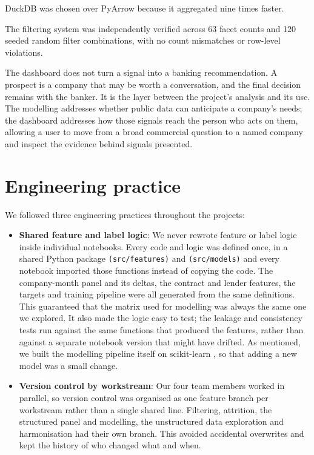 \documentclass[    author={Samuel Menon Demelo; Sneha Saphala Ram Prasad; 
Viktor Ander Lindholm; Vishal Khatri},
               supervisor={Prof. Fernando Moreno-Pino},
                   degree={MSc},
                    title={Lloyds Commercial Banking Intelligence},
                 subtitle={Ranking SME Lending, Risk and Growth Prospects for Lloyds Banking Group},
                     type={},
                     year={2026}]{dissertation}
\begin{document}
DuckDB was chosen over PyArrow because it aggregated nine times faster.

The filtering system was independently verified across 63 facet counts and 120 seeded random filter combinations, with no count mismatches or row-level violations.

The dashboard does not turn a signal into a banking recommendation. A prospect is a company that may be worth a conversation, and the final decision remains with the banker. It is the layer between the project's analysis and its use. The modelling addresses whether public data can anticipate a company's needs; the dashboard addresses how those signals reach the person who acts on them, allowing a user to move from a broad commercial question to a named company and inspect the evidence behind signals presented.

\section{Engineering practice}
We followed three engineering practices throughout the projects:

\begin{itemize}
    \item \textbf{Shared feature and label logic}: We never rewrote feature or label logic inside individual notebooks. Every code and logic was defined once, in a shared Python package \texttt{(src/features)} and \texttt{(src/models)} and every notebook imported those functions instead of copying the code. The company-month panel and its deltas, the contract and lender features, the targets and training pipeline were all generated from the same definitions. This guaranteed that the matrix used for modelling was always the same one we explored. It also made the logic easy to test; the leakage and consistency tests run against the same functions that produced the features, rather than against a separate notebook version that might have drifted. As mentioned, we built the modelling pipeline itself on scikit-learn \cite{sklearn_docs}, so that adding a new model was a small change.
\end{itemize}

\begin{itemize}
    \item \textbf{Version control by workstream}: Our four team members worked in parallel, so version control was organised as one feature branch per workstream rather than a single shared line. Filtering, attrition, the structured panel and modelling, the unstructured data exploration and harmonisation had their own branch. This avoided accidental overwrites and kept the history of who changed what and when.
\end{itemize}
\end{document}
